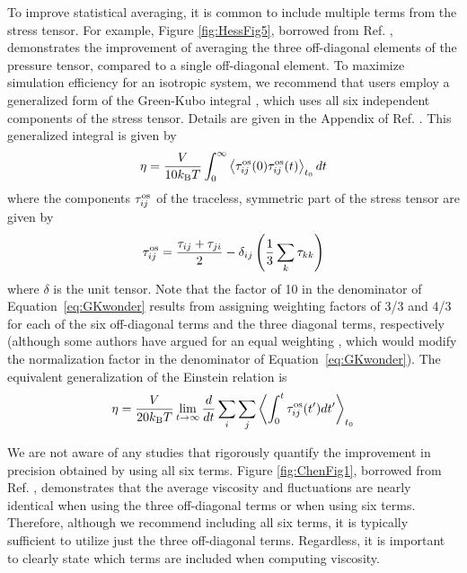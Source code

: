 \documentclass[9pt,bestpractices]{livecoms}
\begin{document}
To improve statistical averaging, it is common to include multiple terms from the stress tensor. For example, Figure \ref{fig:HessFig5}, borrowed from Ref. \cite{Hess2002}, demonstrates the improvement of averaging the three off-diagonal elements of the pressure tensor, compared to a single off-diagonal element. To maximize simulation efficiency for an isotropic system, we recommend that users employ a generalized form of the Green-Kubo integral \citep{Evans:90, Daivis:1994}, which uses all six independent components of the stress tensor. Details are given in the Appendix of Ref. \cite{Daivis:1994}. This generalized integral is given by
\begin{equation}
  \eta = \frac{V}{10 k_{\rm B} T}  \int_0^\infty \left\langle \tau_{ij}^{\rm os}(0)\tau_{ij}^{\rm os}(t) \right\rangle_{t_0} dt
  \label{eq:GKwonder}
\end{equation}
where the components $\tau_{ij}^{\rm os}$ of the traceless, symmetric part of the stress tensor are given by
\begin{equation}
  \tau_{ij}^{\rm os} = \frac{\tau_{ij}+\tau_{ji}}{2} - \delta_{ij} \left( \frac{1}{3} \sum_k \tau_{kk} \right)
  \label{eq:Pwonder}
\end{equation}
where $\delta$ is the unit tensor. Note that the factor of 10 in the denominator of Equation~\ref{eq:GKwonder} results from assigning weighting factors of 3/3 and 4/3 for each of the six off-diagonal terms and the three diagonal terms, respectively \cite{Liu2012,Borodin2009,Mondello1997} (although some authors have argued for an equal weighting \cite{Chen2009}, which would modify the normalization factor in the denominator of Equation~\ref{eq:GKwonder}).
The equivalent generalization of the Einstein relation is
\begin{equation}
  \eta = \frac{V}{20 k_{\rm B} T} \lim_{t\to\infty} \frac{d}{dt} \sum_i \sum_j \left\langle \int_0^t \tau_{ij}^{\rm os}(t') dt' \right\rangle_{t_0}
  \label{eq:Einwonder}
\end{equation}

We are not aware of any studies that rigorously quantify the improvement in precision obtained by using all six terms. Figure \ref{fig:ChenFig1}, borrowed from Ref. \cite{Chen2009}, demonstrates that the average viscosity and fluctuations are nearly identical when using the three off-diagonal terms or when using six terms. Therefore, although we recommend including all six terms, it is typically sufficient to utilize just the three off-diagonal terms. Regardless, it is important to clearly state which terms are included when computing viscosity.
\end{document}
